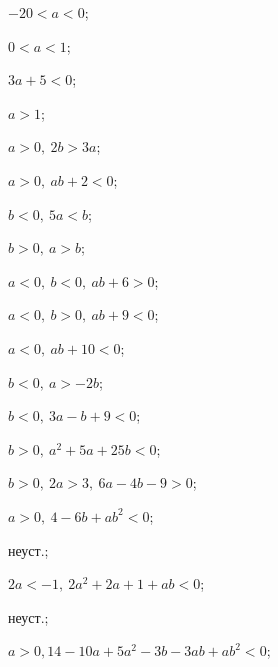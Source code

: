 \begin{enumsols}
		\label{sol:stability_hurwitz:params_ab}
		\item \( -20 < a < 0 \); %
		\item \( 0 < a < 1 \); %
		\item \( 3a + 5 < 0 \); %
		\item \( a > 1 \); %
		\item \( a > 0, ~ 2b > 3a \); %
		\item \( a > 0, ~ ab + 2 < 0 \); %
		\item \( b < 0, ~ 5a < b \); %
		\item \( b > 0, ~ a > b \); %
		\item \( a < 0, ~ b < 0, ~ ab + 6 > 0 \); %
		\item \( a < 0, ~ b > 0, ~ ab + 9 < 0 \); %
		
		\label{sol:stability_hurwitz:params_ab_part2}
		\item \( a < 0, ~ ab + 10 < 0 \); %
		\item \( b < 0, ~ a > -2b \); %
		\item \( b < 0, ~ 3a - b + 9 < 0 \); %
		\item \( b > 0, ~ a^2 + 5a + 25b < 0 \);\newline %
		\item \( b > 0, ~ 2a > 3, ~ 6a - 4b - 9 > 0 \); %
		\item \( a > 0, ~ 4 - 6b + ab^2 < 0 \); %
		\item неуст.; \newline %
		\item \( 2a < -1, ~ 2a^2 + 2a + 1 + ab < 0 \); %
		\item неуст.; %
		\item \( a > 0, 14 - 10a + 5a^2 - 3b - 3 ab + a b^2 < 0 \); %

	\end{enumsols}